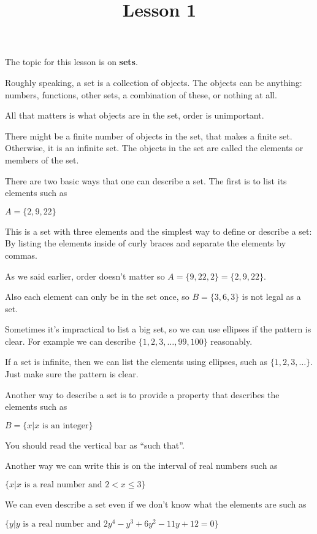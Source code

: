 \documentclass[10pt,a4paper,oneside]{book}
\title{Lesson 1}
\author{}
\date{}
\begin{document}
\maketitle

The topic for this lesson is on \textbf{sets}.

Roughly speaking, a set is a collection of objects. The objects can be anything: numbers, functions, other sets, a combination of these, or nothing at all.

All that matters is what objects are in the set, order is unimportant.

There might be a finite number of objects in the set, that makes a finite set. Otherwise, it is an infinite set. The objects in the set are called the elements or members of the set.

There are two basic ways that one can describe a set. The first is to list its elements such as 
\begin{center}
    $A = \{2,9,22\}$
\end{center}

This is a set with three elements and the simplest way to define or describe a set: By listing the elements inside of curly braces and separate the elements by commas.

As we said earlier, order doesn't matter so $A=\{9,22,2\} = \{2,9,22\}$.

Also each element can only be in the set once, so $B=\{3,6,3\}$ is not legal as a set.

Sometimes it's impractical to list a big set, so we can use ellipses if the pattern is clear. For example
we can describe $\{1,2,3,\dots,99,100\}$ reasonably.

If a set is infinite, then we can list the elements using ellipses, such as $\{1,2,3,\dots\}$. Just make sure the pattern is clear.

Another way to describe a set is to provide a property that describes the elements such as 
\begin{center}
    $B = \{x|x \text{ is an integer} \}$
\end{center}

You should read the vertical bar as ``such that''. 

Another way we can write this is on the interval of real numbers such as 
\begin{center}
    $\{x|x \text{ is a real number and } 2<x\leq 3\}$
\end{center}

We can even describe a set even if we don't know what the elements are such as 
\begin{center}
    $\{y|y \text{ is a real number and } 2y^4-y^3+6y^2-11y+12=0\}$
\end{center}
\end{document}
